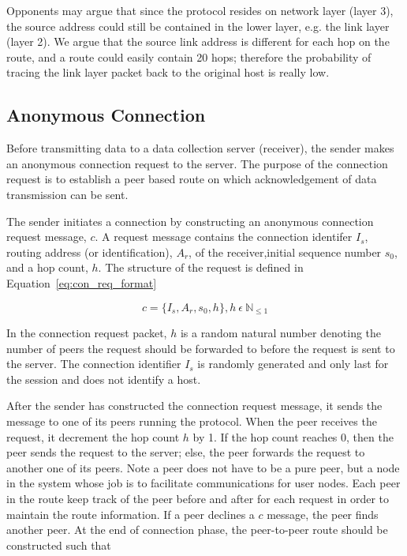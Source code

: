 Opponents may argue that since the protocol resides on network layer (layer 3),
the source address could still be contained in the lower layer, e.g. the link
layer (layer 2). We argue that the source link address is different for
each hop on the route, and a route could easily contain 20 hops; therefore
the probability of tracing the link layer packet back to the original host is
really low.

\subsection{Anonymous Connection}\label{anonymous_connection}

Before transmitting data to a data collection server (receiver), the
sender makes an anonymous connection request to the server. The purpose
of the connection request is to establish a peer based route on which
acknowledgement of data transmission can be sent.

The sender initiates a connection by constructing an anonymous
connection request message, $c$. A request message contains the 
connection identifer $I_s$, routing
address (or identification), $A_r$, of the receiver,initial sequence
number $s_0$, and a hop count,
$h$. The structure of the request is defined in
Equation~\ref{eq:con_req_format}

\begin{equation}\label{eq:con_req_format}
c = \{I_s, A_r, s_0, h\}, h~\epsilon~\mathbb{N}_{\leq1}
\end{equation}

In the connection request packet, $h$ is a random natural number
denoting the number of peers the request should be forwarded to
before the request is sent to the server. The connection identifier $I_s$
is randomly generated and only last for the session and does not identify
a host.

After the sender has constructed the connection request message,
it sends the message to one of its peers running the protocol. When the
peer receives the request, it decrement the hop count $h$ by 1. If
the hop count reaches 0, then the peer sends the request to the server;
else, the peer forwards the request to another one of its peers. Note
a peer does not have to be a pure peer, but a node in the system whose
job is to facilitate communications for user nodes. Each peer in the
route keep track of the peer before and after for each request in order
to maintain the route information. If a peer declines a $c$ message,
the peer finds another peer. At the end of connection phase, the
peer-to-peer route should be constructed such that

